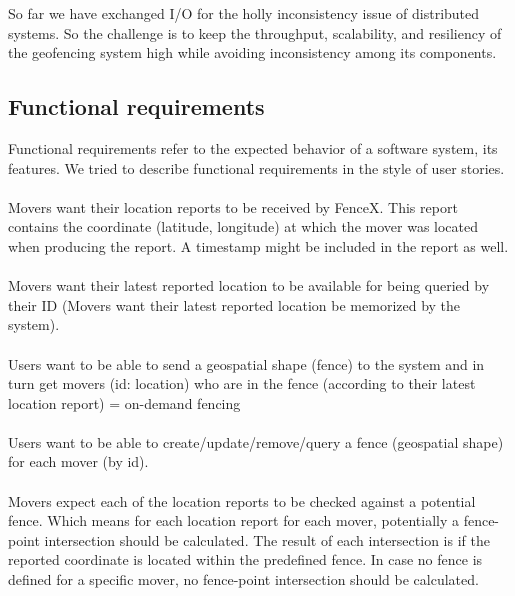 \documentclass[a4]{report}
\begin{document}
    So far we have exchanged I/O for the holly inconsistency issue of distributed systems.
    So the challenge is to keep the throughput, scalability, and resiliency of the geofencing system high while avoiding inconsistency among its components.

    \subsection{Functional requirements}
    Functional requirements refer to the expected behavior of a software system, its features.
    We tried to describe functional requirements in the style of user stories\cite{userStory}.

    \paragraph{}
    Movers want their location reports to be received by FenceX.
    This report contains the coordinate (latitude, longitude) at which the mover was located when producing the report.
    A timestamp might be included in the report as well.

    \paragraph{}
    Movers want their latest reported location to be available for being queried by their ID (Movers want their
    latest reported location be memorized by the system).

    \paragraph{}
    Users want to be able to send a geospatial shape (fence) to the system and in turn get movers (id: location) who
    are in the fence (according to their latest location report) = on-demand fencing

    \paragraph{}
    Users want to be able to create/update/remove/query a fence (geospatial shape) for each mover (by id).

    \paragraph{}
    Movers expect each of the location reports to be checked against a potential fence.
    Which means for each location report for each mover, potentially a fence-point intersection should be calculated.
    The result of each intersection is if the reported coordinate is located within the predefined fence.
    In case no fence is defined for a specific mover, no fence-point intersection should be calculated.
\end{document}
